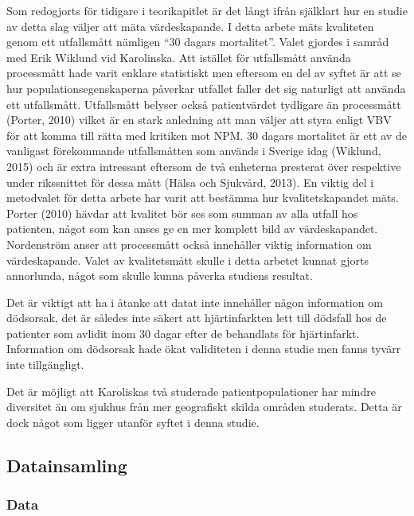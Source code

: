 Som redogjorts för tidigare i teorikapitlet är det långt ifrån själklart hur en studie av detta slag väljer att mäta värdeskapande. I detta arbete mäts kvaliteten genom ett utfallsmått nämligen “30 dagars mortalitet”. Valet gjordes i samråd med Erik Wiklund vid Karolinska. Att istället för utfallsmått använda processmått hade varit enklare statistiskt men eftersom en del av syftet är att se hur populationsegenskaperna påverkar utfallet faller det sig naturligt att använda ett utfallsmått. Utfallsmått belyser också patientvärdet tydligare än processmått (Porter, 2010) vilket är en stark anledning att man väljer att styra enligt VBV för att komma till rätta med kritiken mot NPM. 30 dagars mortalitet är ett av de vanligast förekommande utfallsmåtten som används i Sverige idag (Wiklund, 2015) och är extra intressant eftersom de två enheterna presterat över respektive under rikssnittet för dessa mått (Hälsa och Sjukvård, 2013). En viktig del i metodvalet för detta arbete har varit att bestämma hur kvalitetskapandet mäts. Porter (2010) hävdar att kvalitet bör ses som summan av alla utfall hos patienten, något som kan anses ge en mer komplett bild av värdeskapandet. Nordenström anser att processmått också innehåller viktig information om värdeskapande. Valet av kvalitetsmått skulle i detta arbetet kunnat gjorts annorlunda, något som skulle kunna påverka studiens resultat.

Det är viktigt att ha i åtanke att datat inte innehåller någon information om dödsorsak, det är således inte säkert att hjärtinfarkten lett till dödsfall hos de patienter som avlidit inom 30 dagar efter de behandlats för hjärtinfarkt. Information om dödsorsak hade ökat validiteten i denna studie men fanns tyvärr inte tillgängligt.

Det är möjligt att Karoliskas två studerade patientpopulationer har mindre diversitet än om sjukhus från mer geografiskt skilda områden studerats. Detta är dock något som ligger utanför syftet i denna studie.

\subsection{Datainsamling}

\subsubsection{Data}

